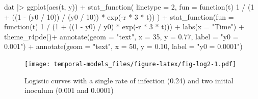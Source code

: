 \documentclass[
  letterpaper,
]{book}
\newenvironment{Shaded}{\begin{snugshade}}{\end{snugshade}}
\newcommand{\AttributeTok}[1]{\textcolor[rgb]{0.40,0.45,0.13}{#1}}
\newcommand{\ControlFlowTok}[1]{\textcolor[rgb]{0.00,0.23,0.31}{#1}}
\newcommand{\DecValTok}[1]{\textcolor[rgb]{0.68,0.00,0.00}{#1}}
\newcommand{\FloatTok}[1]{\textcolor[rgb]{0.68,0.00,0.00}{#1}}
\newcommand{\FunctionTok}[1]{\textcolor[rgb]{0.28,0.35,0.67}{#1}}
\newcommand{\NormalTok}[1]{\textcolor[rgb]{0.00,0.23,0.31}{#1}}
\newcommand{\SpecialCharTok}[1]{\textcolor[rgb]{0.37,0.37,0.37}{#1}}
\newcommand{\StringTok}[1]{\textcolor[rgb]{0.13,0.47,0.30}{#1}}
\begin{document}
\begin{Shaded}
\begin{Highlighting}[]
\NormalTok{dat }\SpecialCharTok{|\textgreater{}}
  \FunctionTok{ggplot}\NormalTok{(}\FunctionTok{aes}\NormalTok{(t, y)) }\SpecialCharTok{+}
  \FunctionTok{stat\_function}\NormalTok{(}
    \AttributeTok{linetype =} \DecValTok{2}\NormalTok{,}
    \AttributeTok{fun =} \ControlFlowTok{function}\NormalTok{(t) }\DecValTok{1} \SpecialCharTok{/}\NormalTok{ (}\DecValTok{1} \SpecialCharTok{+}\NormalTok{ ((}\DecValTok{1} \SpecialCharTok{{-}}\NormalTok{ (y0 }\SpecialCharTok{/} \DecValTok{10}\NormalTok{)) }\SpecialCharTok{/}\NormalTok{ (y0 }\SpecialCharTok{/} \DecValTok{10}\NormalTok{)) }\SpecialCharTok{*} \FunctionTok{exp}\NormalTok{(}\SpecialCharTok{{-}}\NormalTok{r }\SpecialCharTok{*} \DecValTok{3} \SpecialCharTok{*}\NormalTok{ t))}
\NormalTok{  ) }\SpecialCharTok{+}
  \FunctionTok{stat\_function}\NormalTok{(}\AttributeTok{fun =} \ControlFlowTok{function}\NormalTok{(t) }\DecValTok{1} \SpecialCharTok{/}\NormalTok{ (}\DecValTok{1} \SpecialCharTok{+}\NormalTok{ ((}\DecValTok{1} \SpecialCharTok{{-}}\NormalTok{ y0) }\SpecialCharTok{/}\NormalTok{ y0) }\SpecialCharTok{*} \FunctionTok{exp}\NormalTok{(}\SpecialCharTok{{-}}\NormalTok{r }\SpecialCharTok{*} \DecValTok{3} \SpecialCharTok{*}\NormalTok{ t))) }\SpecialCharTok{+}
  \FunctionTok{labs}\NormalTok{(}\AttributeTok{x =} \StringTok{"Time"}\NormalTok{) }\SpecialCharTok{+}
 \FunctionTok{theme\_r4pde}\NormalTok{()}\SpecialCharTok{+}
  \FunctionTok{annotate}\NormalTok{(}\AttributeTok{geom =} \StringTok{"text"}\NormalTok{, }\AttributeTok{x =} \DecValTok{35}\NormalTok{, }\AttributeTok{y =} \FloatTok{0.77}\NormalTok{, }\AttributeTok{label =} \StringTok{"y0 = 0.001"}\NormalTok{) }\SpecialCharTok{+}
  \FunctionTok{annotate}\NormalTok{(}\AttributeTok{geom =} \StringTok{"text"}\NormalTok{, }\AttributeTok{x =} \DecValTok{50}\NormalTok{, }\AttributeTok{y =} \FloatTok{0.10}\NormalTok{, }\AttributeTok{label =} \StringTok{"y0 = 0.0001"}\NormalTok{)}
\end{Highlighting}
\end{Shaded}

\begin{figure}

\texttt{[image: temporal-models\_files/figure-latex/fig-log2-1.pdf]} \hfill{}

\caption{\label{fig-log2}Logistic curves with a single rate of infection
(0.24) and two initial inoculum (0.001 and 0.0001)}

\end{figure}
\end{document}
